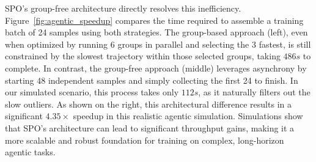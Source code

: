 SPO's group-free architecture directly resolves this inefficiency. Figure~\ref{fig:agentic_speedup} compares the time required to assemble a training batch of 24 samples using both strategies. The group-based approach (left), even when optimized by running 6 groups in parallel and selecting the 3 fastest, is still constrained by the slowest trajectory within those selected groups, taking $486s$ to complete. In contrast, the group-free approach (middle) leverages asynchrony by starting 48 independent samples and simply collecting the first 24 to finish. In our simulated scenario, this process takes only $112s$, as it naturally filters out the slow outliers. As shown on the right, this architectural difference results in a significant $\mathbf{4.35\times}$ speedup in this realistic agentic simulation. Simulations show that SPO's architecture can lead to significant throughput gains, making it a more scalable and robust foundation for training on complex, long-horizon agentic tasks.























